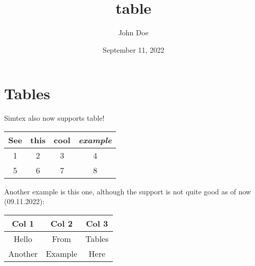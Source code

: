 \documentclass[12pt, UTF8]{article}
\title{table}
\author{John Doe}
\date{September 11, 2022}
\begin{document}
	\maketitle

	\section{Tables}

	Simtex also now supports table!

	\begin{center}
		\begin{tabular}{| c | c | c | c |}		\hline
			See & \textbf{this} & cool & \textit{example} \\
			\hline
			1 & 2 & 3 & 4 \\
			5 & 6 & 7 & 8 \\		\hline
		\end{tabular}
	\end{center}

	Another example is this one, although the support is not quite good as of now (09.11.2022):

	\begin{center}
		\begin{tabular}{| c | c | c |}		\hline
			Col 1 & Col 2 & Col 3 \\
			\hline
			Hello & From & Tables \\
			Another & Example & Here \\		\hline
		\end{tabular}
	\end{center}
\end{document}
